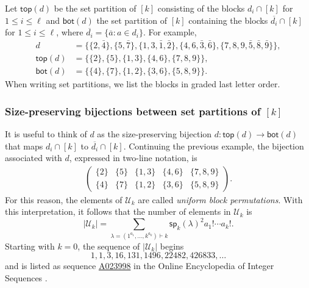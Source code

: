\documentclass[ALCO,Unicode]{cedram}
\newcommand{\defncolor}{\color{darkred}}
\newcommand{\defn}[1]{{\defncolor\emph{#1}}} %
\begin{document}
Let $\mathsf{top}(d)$ be the set partition of $[k]$ consisting of the blocks $d_i \cap [k]$
for $1 \leqslant i \leqslant \ell$ and $\mathsf{bot}(d)$ the set
partition of $[k]$ containing the blocks $\overline{d_i} \cap [k]$
for $1 \leqslant i \leqslant \ell$, where $\overline{d_i} = \{ \overline{a} : a \in d_i\}$. For example,
\begin{align*}
    d & = \{ \{2,\bar{4} \}, \{5,\bar{7} \}, \{1,3,\bar{1},\bar{2} \}, \{4,6,\bar{3}, \bar{6}\}, \{7, 8, 9, \bar{5}, \bar{8}, \bar{9} \}  \},\\
\mathsf{top}(d) &=\{\{2\}, \{5\}, \{ 1,3\},  \{4, 6\},  \{7, 8, 9\}\},\\
\mathsf{bot}(d) &=\{ \{ 4\}, \{7\},  \{1,2\},\{3,6\},  \{5, 8, 9\}\}.
\end{align*}
When writing set partitions, we list the blocks in graded last letter order.

\subsubsection{Size-preserving bijections between set partitions of $[k]$}
\label{sssection:bijection}
It is useful to think of $d$ as the size-preserving bijection $d \colon
\mathsf{top}(d) \rightarrow \mathsf{bot}(d)$ that maps
$d_i \cap [k]$ to $\overline{d_i} \cap [k]$.
Continuing the previous example, the bijection associated with $d$, expressed
in two-line notation, is
\begin{align*}
    \left(
        \begin{array}{ccccc}
            \{2\} & \{5\} & \{ 1,3\} & \{4, 6\} & \{7, 8, 9\}\\
            \{4\} & \{7\} & \{1,2\}  & \{3,6\}  & \{5, 8, 9\}
        \end{array}
    \right).
\end{align*}
For this reason, the elements of $\mathcal{U}_k$ are called \defn{uniform block
permutations}. With this interpretation, it follows that the number of elements
in $\mathcal{U}_k$ is
\[
     |\mathcal{U}_k| = \sum_{\lambda = (1^{a_1}, \ldots, k^{a_k})\vdash k} \mathsf{sp}_k(\lambda)^2 a_1! \cdots a_k!.
\]
Starting with $k=0$, the sequence of $ |\mathcal{U}_k|$ begins
\[
1, 1, 3, 16, 131, 1496, 22482, 426833,\ldots
\]
and is listed as sequence \href{https://oeis.org/A023998}{A023998}
in the Online Encyclopedia of Integer Sequences \cite{OEIS}.
\end{document}
